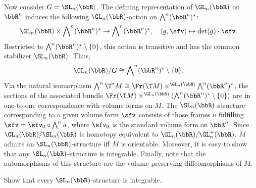 \begin{example}
    Now consider $G=\SL_n(\bbR)$. The defining representation of $\GL_n(\bbR)$ on $\bbR^n$ induces the following $\GL_n(\bbR)$-action on $\bigwedge\nolimits^n(\bbR^n)^\ast$: 
    \[\GL_n(\bbR)\times \bigwedge\nolimits^n(\bbR^n)^\ast\to  \bigwedge\nolimits^n(\bbR^n)^\ast,\quad (g,\sfv)\mapsto \det(g)\cdot\sfv.\]
    Restricted to $\bigwedge\nolimits^n(\bbR^n)^\ast\setminus\{0\}$, this action is transitive and has the common stabilizer $\SL_n(\bbR)$. Thus, 
    \[\GL_n(\bbR)\slash G\cong \bigwedge\nolimits^n(\bbR^n)^\ast\setminus\{0\}.\]
    Via the natural isomorphism $\bigwedge\nolimits^n \T^\ast M\cong \Fr(\T M)\times^{\GL_n(\bbR)}\bigwedge\nolimits^n(\bbR^n)^\ast$, the sections of the associated bundle $\Fr(\T M)\times^{\GL_n(\bbR)} \left(\bigwedge\nolimits^n(\bbR^n)^\ast\setminus\{0\}\right)$ are in one-to-one correspondence with volume forms on $M$. The $\SL_n(\bbR)$-structure corresponding to a given volume form $\sfv$ consists of those frames $u$ fulfilling $\sfv=\sfv_0\circ \bigwedge\nolimits^n u$, where $\sfv_0$ is the standard volume form on $\bbR^n$. Since $\GL_n(\bbR)\slash\SL_n(\bbR)$ is homotopy equivalent to $\GL_n(\bbR)\slash \GL_n^+(\bbR)$, $M$ admits an $\SL_n(\bbR)$-structure iff $M$ is orientable. Moreover, it is easy to show that any $\SL_n(\bbR)$-structure is integrable. Finally, note that the automorphisms of this structure are the volume-preserving diffeomorphisms of $M$.
\end{example}
\begin{xca}
    Show that every $\SL_n(\bbR)$-structure is integrable.
\end{xca}

